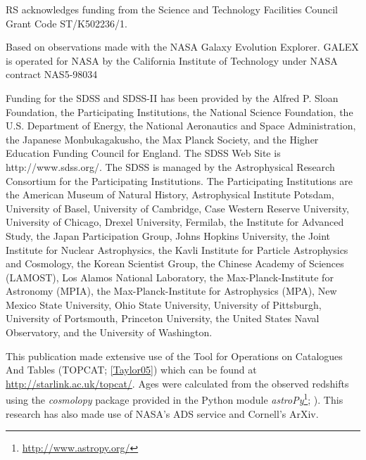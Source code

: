 \documentclass[useAMS,usenatbib]{mn2e}
\begin{document}
RS acknowledges funding from the Science and Technology Facilities Council Grant Code ST/K502236/1.

Based on observations made with the NASA Galaxy Evolution Explorer.  GALEX is operated for NASA by the California Institute of Technology under NASA contract NAS5-98034

Funding for the SDSS and SDSS-II has been provided by the Alfred P. Sloan Foundation, the Participating Institutions, the National Science Foundation, the U.S. Department of Energy, the National Aeronautics and Space Administration, the Japanese Monbukagakusho, the Max Planck Society, and the Higher Education Funding Council for England. The SDSS Web Site is http://www.sdss.org/.
The SDSS is managed by the Astrophysical Research Consortium for the Participating Institutions. The Participating Institutions are the American Museum of Natural History, Astrophysical Institute Potsdam, University of Basel, University of Cambridge, Case Western Reserve University, University of Chicago, Drexel University, Fermilab, the Institute for Advanced Study, the Japan Participation Group, Johns Hopkins University, the Joint Institute for Nuclear Astrophysics, the Kavli Institute for Particle Astrophysics and Cosmology, the Korean Scientist Group, the Chinese Academy of Sciences (LAMOST), Los Alamos National Laboratory, the Max-Planck-Institute for Astronomy (MPIA), the Max-Planck-Institute for Astrophysics (MPA), New Mexico State University, Ohio State University, University of Pittsburgh, University of Portsmouth, Princeton University, the United States Naval Observatory, and the University of Washington.

This publication made extensive use of the Tool for Operations on Catalogues And Tables (TOPCAT; \ref{Taylor05}) which can be found at \url{http://starlink.ac.uk/topcat/}. Ages were calculated from the observed redshifts using the \emph{cosmolopy} package provided in the Python module \emph{astroPy}\footnote{\url{http://www.astropy.org/}}; \citealt{Rob13}). This research has also made use of NASA's ADS service and Cornell's ArXiv. 
\end{document}
